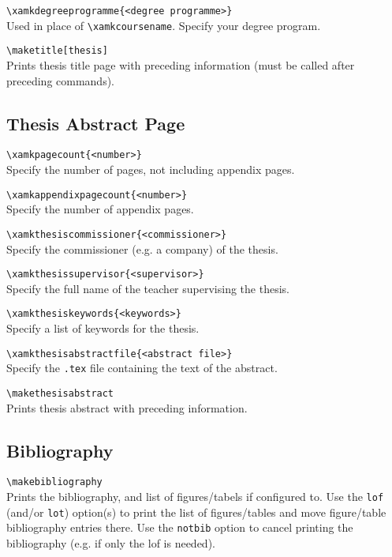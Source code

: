 \verb|\xamkdegreeprogramme{<degree programme>}|\\
Used in place of \verb|\xamkcoursename|.
Specify your degree program.

\verb|\maketitle[thesis]|\\
Prints thesis title page with preceding information (must be called after preceding commands).

\subsection{Thesis Abstract Page}

\verb|\xamkpagecount{<number>}|\\
Specify the number of pages, not including appendix pages.

\verb|\xamkappendixpagecount{<number>}|\\
Specify the number of appendix pages.

\verb|\xamkthesiscommissioner{<commissioner>}|\\
Specify the commissioner (e.g. a company) of the thesis.

\verb|\xamkthesissupervisor{<supervisor>}|\\
Specify the full name of the teacher supervising the thesis.

\verb|\xamkthesiskeywords{<keywords>}|\\
Specify a list of keywords for the thesis.

\verb|\xamkthesisabstractfile{<abstract file>}|\\
Specify the \verb|.tex| file containing the text of the abstract.

\verb|\makethesisabstract|\\
Prints thesis abstract with preceding information.

\subsection{Bibliography}

\verb|\makebibliography|\\
Prints the bibliography, and list of figures/tabels if configured to.
Use the \verb|lof| (and/or \verb|lot|) option(s) to print the list of figures/tables and move figure/table bibliography entries there.
Use the \verb|notbib| option to cancel printing the bibliography (e.g. if only the lof is needed).

